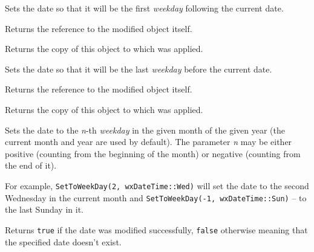 Sets the date so that it will be the first {\it weekday} following the current
date.

Returns the reference to the modified object itself.


\label{wxdatetimegetnextweekday}


Returns the copy of this object to which
 was applied.


\label{wxdatetimesettoprevweekday}


Sets the date so that it will be the last {\it weekday} before the current
date.

Returns the reference to the modified object itself.


\label{wxdatetimegetprevweekday}


Returns the copy of this object to which
 was applied.


\label{wxdatetimesettoweekday}


Sets the date to the {\it n}-th {\it weekday} in the given month of the given
year (the current month and year are used by default). The parameter {\it n}
may be either positive (counting from the beginning of the month) or negative
(counting from the end of it).

For example, {\tt SetToWeekDay(2, wxDateTime::Wed)} will set the date to the
second Wednesday in the current month and
{\tt SetToWeekDay(-1, wxDateTime::Sun)} -- to the last Sunday in it.

Returns {\tt true} if the date was modified successfully, {\tt false}
otherwise meaning that the specified date doesn't exist.


\label{wxdatetimegetweekday2}


